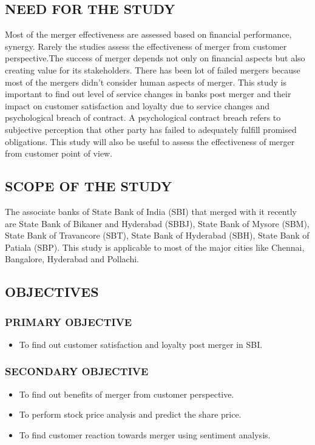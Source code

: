 \documentclass[a4paper, 12pt]{extarticle}
\begin{document}
{\subsection{NEED FOR THE STUDY}
\par Most of the merger effectiveness are assessed based on financial performance, synergy. Rarely the studies assess the effectiveness of merger from customer perspective.The success of merger depends not only on financial aspects but also creating value for its stakeholders. There has been lot of failed mergers because most of the mergers didn't consider human aspects of merger. This study is important to find out level of service changes in banks post merger and their impact on customer satisfaction and loyalty due to service changes and psychological breach of contract. A psychological contract breach refers to subjective perception that other party has failed to adequately fulfill promised obligations. This study will also be useful to assess the effectiveness of merger from customer point of view.

\subsection{SCOPE OF THE STUDY}
The associate banks of State Bank of India (SBI) that merged with it recently are State Bank of Bikaner and Hyderabad (SBBJ), State Bank of Mysore (SBM), State Bank of Travancore (SBT), State Bank of Hyderabad (SBH), State Bank of Patiala (SBP). This study is applicable to most of the major cities like Chennai, Bangalore, Hyderabad and Pollachi.

\subsection{OBJECTIVES}
\subsubsection{PRIMARY OBJECTIVE}
\begin{itemize}
\item To find out customer satisfaction and loyalty post merger in SBI.
\end{itemize}
\subsubsection{SECONDARY OBJECTIVE}
\begin{itemize}
\item To find out benefits of merger from customer perspective.
\item To perform stock price analysis and predict the share price.
\item To find customer reaction towards merger using sentiment analysis.
\end{itemize}

}
\end{document}

